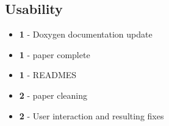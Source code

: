 \documentclass[]{Photos_interface_design}
\begin{document}
\subsection*{Usability}
\begin{itemize}
  \item[\ding{111}]{\bf 1} - Doxygen documentation update
  \item[\ding{111}]{\bf 1} - paper complete
  \item[\ding{111}]{\bf 1} - READMES 
  \item[\ding{111}]{\bf 2} - paper cleaning
  \item[\ding{111}]{\bf 2} - User interaction and resulting fixes
\end{itemize}
\end{document}
